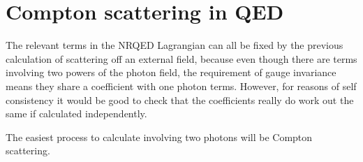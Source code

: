 \section{Compton scattering in QED}
The relevant terms in the NRQED Lagrangian can all be fixed by the previous calculation of scattering off an external field, because even though there are terms involving two powers of the photon field, the requirement of gauge invariance means they share a coefficient with one photon terms.  However, for reasons of self consistency it would be good to check that the coefficients really do work out the same if calculated independently.

The easiest process to calculate involving two photons will be Compton scattering.   


